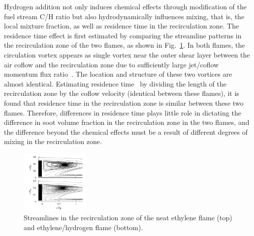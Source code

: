 \documentclass[review,3p,times]{elsarticle}
\begin{document}
  
Hydrogen addition not only induces chemical effects through modification of the fuel stream C/H ratio but also hydrodynamically influences mixing, that is, the local mixture fraction, as well as residence time in the recirculation zone.  The residence time effect is first estimated by comparing the streamline patterns in the recirculation zone of the two flames, as shown in Fig.~\ref{fig:streamline}.  In both flames, the circulation vortex appears as single vortex near the outer shear layer between the air coflow and the recirculation zone due to sufficiently large jet/coflow momentum flux ratio~\cite{dally98a,dally98b}.  The location and structure of these two vortices are almost identical.  Estimating residence time~\cite{dally96} by dividing the length of the recirculation zone by the coflow velocity (identical between these flames), it is found that residence time in the recirculation zone is similar between these two flames.  Therefore, differences in residence time plays little role in dictating the difference in soot volume fraction in the recirculation zone in the two flames, and the difference beyond the chemical effects must be a result of different degrees of mixing in the recirculation zone.

\begin{figure}[t]
  \centering
  \scriptsize
  \vspace{-0.10in}
  \includegraphics[trim=12.0mm 2.0mm 8mm 5mm, clip=true, width=0.3\textwidth]{streamline.png}
  \normalsize
  \vspace{-0.1in}
  \caption{Streamlines in the recirculation zone of the neat ethylene flame (top) and ethylene/hydrogen flame (bottom).}
  \label{fig:streamline}
\end{figure}
\end{document}
